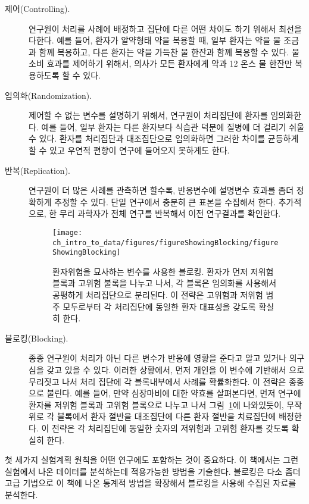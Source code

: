 \begin{description}
\item[제어(Controlling).] 
연구원이 처리를 사례에 배정하고 집단에 다른 어떤 차이도 하기 위해서 최선을 다한다.
예를 들어, 환자가 알약형태 약을 복용할 때, 일부 환자는 약을 물 조금과 함께 복용하고, 다른 환자는 약을 가득찬 물 한잔과 함께 복용할 수 있다. 물 소비 효과를 제어하기 위해서, 의사가 모든 환자에게 약과 12 온스 물 한잔만 복용하도록 할 수 있다.
\item[임의화(Randomization).] 
제어할 수 없는 변수를 설명하기 위해서, 연구원이 처리집단에 환자를 임의화한다.
예를 들어, 일부 환자는 다른 환자보다 식습관 덕분에 질병에 더 걸리기 쉬울 수 있다.
환자를 처리집단과 대조집단으로 임의화하면 그러한 차이를 균등하게 할 수 있고 우연적 편향이 연구에 들어오지 못하게도 한다.
\item[반복(Replication).] 
연구원이 더 많은 사례를 관측하면 할수록, 반응변수에 설명변수 효과를 좀더 정확하게 추정할 수 있다.
단일 연구에서 충분히 큰 표본을 수집해서 한다. 추가적으로, 한 무리 과학자가 전체 연구를 반복해서 이전 연구결과를 확인한다.

\begin{figure}
\centering
\texttt{[image: ch\_intro\_to\_data/figures/figureShowingBlocking/figureShowingBlocking]}
\caption{환자위험을 묘사하는 변수를 사용한 블로킹.
환자가 먼저 저위험 블록과 고위험 불록을 나누고 나서, 각 블록은 임의화를 사용해서 공평하게 처리집단으로 분리된다.
이 전략은 고위험과 저위험 범주 모두로부터 각 처리집단에 동일한 환자 대표성을 갖도록 확실히 한다.}
\label{figureShowingBlocking}
\end{figure}

\item[블로킹(Blocking).] 
종종 연구원이 처리가 아닌 다른 변수가 반응에 영황을 준다고 알고 있거나 의구심을 갖고 있을 수 있다.
이러한 상황에서, 먼저 개인을 이 변수에 기반해서 으로 무리짓고 나서 처리 집단에 각 블록내부에서 사례를 확률화한다.
이 전략은 종종 으로 불린다. 예를 들어,
만약 심장마비에 대한 약효를 살펴본다면, 먼저 연구에 환자를 저위험 블록과 고위험 블록으로 나누고 나서 
그림~\ref{figureShowingBlocking}에 나와있듯이, 무작위로 각 블록에서 환자 절반을 대조집단에 다른 환자 절반을 치료집단에 배정한다.
이 전략은 각 처리집단에 동일한 숫자의 저위험과 고위험 환자를 갖도록 확실히 한다.
\end{description}

첫 세가지 실험계획 원칙을 어떤 연구에도 포함하는 것이 중요하다.
이 책에서는 그런 실험에서 나온 데이터를 분석하는데 적용가능한 방법을 기술한다.
블로킹은 다소 좀더 고급 기법으로 이 책에 나온 통계적 방법을 확장해서 블로킹을 사용해 수집된 자료를 분석한다.

